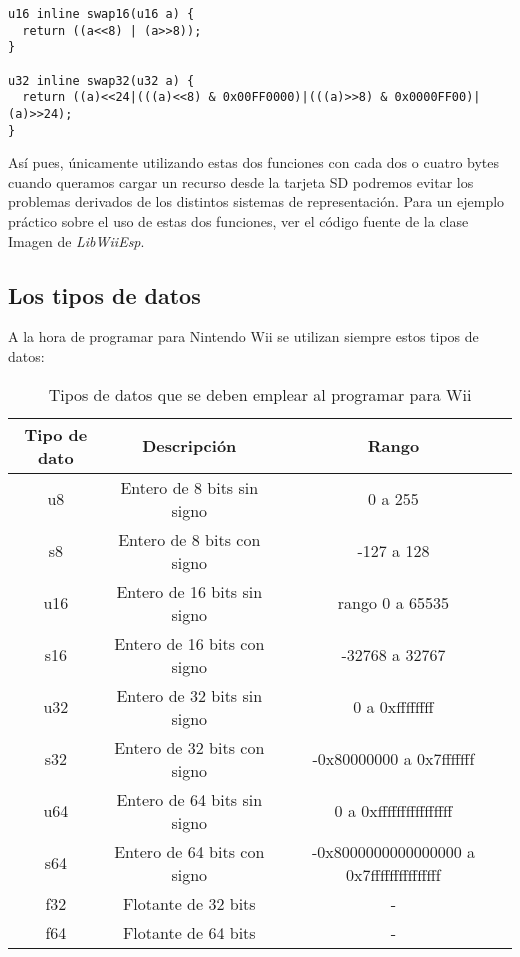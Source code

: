 \begin{lstlisting}[style=C++]
u16 inline swap16(u16 a) {
  return ((a<<8) | (a>>8));
}

u32 inline swap32(u32 a) {
  return ((a)<<24|(((a)<<8) & 0x00FF0000)|(((a)>>8) & 0x0000FF00)|(a)>>24);
}
\end{lstlisting}

Así pues, únicamente utilizando estas dos funciones con cada dos o cuatro bytes cuando queramos cargar un recurso desde la tarjeta SD podremos evitar los problemas derivados de los distintos sistemas de representación. Para un ejemplo práctico sobre el uso de estas dos funciones, ver el código fuente de la clase Imagen de \emph{LibWiiEsp}.

\subsection{Los tipos de datos}

A la hora de programar para Nintendo Wii se utilizan siempre estos tipos de datos:

\begin{table}[H]
  \label{tiposdatos}
  \begin{center}
  \begin{tabular}{| c | c | c |}
    \hline
    Tipo de dato & Descripción & Rango \\ \hline
    u8 & Entero de 8 bits sin signo & 0 a 255 \\ \hline
    s8 & Entero de 8 bits con signo & -127 a 128 \\ \hline
    u16 & Entero de 16 bits sin signo & rango 0 a 65535 \\ \hline
    s16 & Entero de 16 bits con signo & -32768 a 32767 \\ \hline
    u32 & Entero de 32 bits sin signo & 0 a 0xffffffff \\ \hline
    s32 & Entero de 32 bits con signo & -0x80000000 a 0x7fffffff \\ \hline
    u64 & Entero de 64 bits sin signo & 0 a 0xffffffffffffffff \\ \hline
    s64 & Entero de 64 bits con signo & -0x8000000000000000 a 0x7fffffffffffffff  \\ \hline
    f32 & Flotante de 32 bits & - \\ \hline
    f64 & Flotante de 64 bits & - \\ \hline
  \end{tabular}
  \end{center}
  \caption{Tipos de datos que se deben emplear al programar para Wii}
\end{table}

